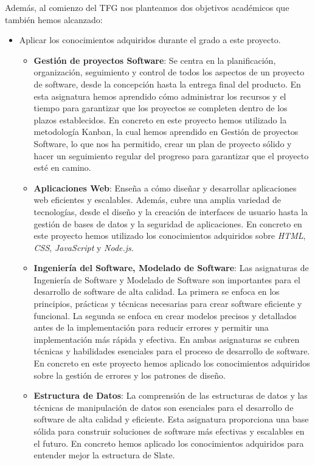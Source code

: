  Además, al comienzo del TFG nos planteamos dos objetivos académicos que también hemos alcanzado:
 \begin{itemize}
    \item Aplicar los conocimientos adquiridos durante el grado a este proyecto.
    \begin{itemize}
        \item \textbf{Gestión de proyectos Software}: Se centra en la planificación, organización, seguimiento y control de todos los aspectos de un proyecto de software, desde la concepción hasta la entrega final del producto. En esta asignatura hemos aprendido cómo administrar los recursos y el tiempo para garantizar que los proyectos se completen dentro de los plazos establecidos. En concreto en este proyecto hemos utilizado la metodología Kanban, la cual hemos aprendido en Gestión de proyectos Software, lo que nos ha permitido, crear un plan de proyecto sólido y hacer un seguimiento regular del progreso para garantizar que el proyecto esté en camino.
        \item \textbf{Aplicaciones Web}: Enseña a cómo diseñar y desarrollar aplicaciones web eficientes y escalables. Además, cubre una amplia variedad de tecnologías, desde el diseño y la creación de interfaces de usuario hasta la gestión de bases de datos y la seguridad de aplicaciones. En concreto en este proyecto hemos utilizado los conocimientos adquiridos sobre \textit{HTML}, \textit{CSS}, \textit{JavaScript} y \textit{Node.js}.
        \item \textbf{Ingeniería del Software, Modelado de Software}: Las asignaturas de Ingeniería de Software y Modelado de Software son importantes para el desarrollo de software de alta calidad. La primera se enfoca en los principios, prácticas y técnicas necesarias para crear software eficiente y funcional. La segunda se enfoca en crear modelos precisos y detallados antes de la implementación para reducir errores y permitir una implementación más rápida y efectiva. En ambas asignaturas se cubren técnicas y habilidades esenciales para el proceso de desarrollo de software. En concreto en este proyecto hemos aplicado los conocimientos adquiridos sobre la gestión de errores y los patrones de diseño.
        \item \textbf{Estructura de Datos}: La comprensión de las estructuras de datos y las técnicas de manipulación de datos son esenciales para el desarrollo de software de alta calidad y eficiente. Esta asignatura proporciona una base sólida para construir soluciones de software más efectivas y escalables en el futuro. En concreto hemos aplicado los conocimientos adquiridos para entender mejor la estructura de Slate.

\end{itemize}
\end{itemize}
